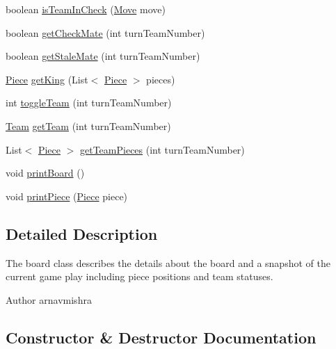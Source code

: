 \begin{DoxyCompactItemize}
\item 
boolean \hyperlink{class_framework_1_1_board_a5684a04e19215778fd062cad9659ffb3}{is\+Team\+In\+Check} (\hyperlink{class_framework_1_1_move}{Move} move)
\item 
boolean \hyperlink{class_framework_1_1_board_a73c5e51640524eeb2f34ca829e94dd02}{get\+Check\+Mate} (int turn\+Team\+Number)
\item 
boolean \hyperlink{class_framework_1_1_board_a78b623ba2854867de4ec93ffdd38e71a}{get\+Stale\+Mate} (int turn\+Team\+Number)
\item 
\hyperlink{class_framework_1_1_pieces_1_1_piece}{Piece} \hyperlink{class_framework_1_1_board_a3b496b97b747b51a2777ee6b4034a5bd}{get\+King} (List$<$ \hyperlink{class_framework_1_1_pieces_1_1_piece}{Piece} $>$ pieces)
\item 
int \hyperlink{class_framework_1_1_board_a663c0d593176957549a4d355765bbf5a}{toggle\+Team} (int turn\+Team\+Number)
\item 
\hyperlink{class_framework_1_1_team}{Team} \hyperlink{class_framework_1_1_board_ac1a52fc412661b89b7aed7017b26a808}{get\+Team} (int turn\+Team\+Number)
\item 
List$<$ \hyperlink{class_framework_1_1_pieces_1_1_piece}{Piece} $>$ \hyperlink{class_framework_1_1_board_ab498be3f988702047c9ac22934fe471a}{get\+Team\+Pieces} (int turn\+Team\+Number)
\item 
void \hyperlink{class_framework_1_1_board_ae18508acc0c51e9b9b1af6a3d52a6860}{print\+Board} ()
\item 
void \hyperlink{class_framework_1_1_board_a656f19360facc6e1ebcc013fe4c59b5a}{print\+Piece} (\hyperlink{class_framework_1_1_pieces_1_1_piece}{Piece} piece)
\end{DoxyCompactItemize}


\subsection{Detailed Description}
The board class describes the details about the board and a snapshot of the current game play including piece positions and team statuses. \begin{DoxyAuthor}{Author}
arnavmishra 
\end{DoxyAuthor}


\subsection{Constructor \& Destructor Documentation}
\hypertarget{class_framework_1_1_board_a2738a7191b7eed3385d092c60c23a2e1}{}\label{class_framework_1_1_board_a2738a7191b7eed3385d092c60c23a2e1} 
